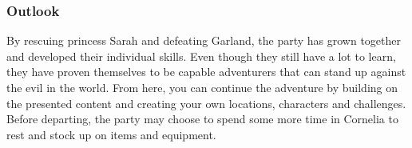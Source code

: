 \subsubsection*{Outlook}
By rescuing princess Sarah and defeating Garland, the party has grown together and developed their individual skills.
Even though they still have a lot to learn, they have proven themselves to be capable adventurers that can stand up against the evil in the world.
From here, you can continue the adventure by building on the presented content and creating your own locations, characters and challenges.
Before departing, the party may choose to spend some more time in Cornelia to rest and stock up on items and equipment.
